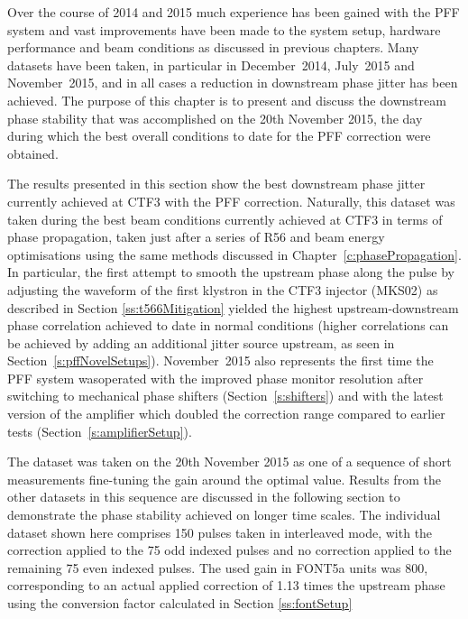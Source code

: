 
Over the course of 2014 and 2015 much experience has been gained with the PFF system
and vast improvements have been made to the system setup, hardware performance and
beam conditions as discussed in previous chapters. Many datasets have been taken, in
particular in December~2014, July~2015 and November~2015, and in all cases a reduction 
in downstream phase jitter has been achieved. The purpose of this chapter is
to present and discuss the downstream phase stability that was accomplished on 
the 20th November 2015, the day during which the best overall conditions to 
date for the PFF correction were obtained.


The results presented in this section show the best downstream phase jitter 
currently achieved at CTF3 with the PFF correction. Naturally, this dataset was 
taken during the best beam conditions currently achieved at CTF3 in terms of
phase propagation, taken just after a series of R56 and beam energy optimisations
using the same methods discussed in Chapter~\ref{c:phasePropagation}. 
In particular, the first attempt to smooth the upstream phase along 
the pulse by adjusting the waveform of the first klystron in the CTF3 injector (MKS02) 
as described in Section \ref{ss:t566Mitigation} yielded the highest upstream-downstream
phase correlation achieved to date in normal conditions (higher correlations can be
achieved by adding an additional jitter source upstream, as seen in 
Section~\ref{s:pffNovelSetups}). 
November~2015 also represents the first time the PFF system wasoperated with 
the improved phase monitor resolution
after switching to mechanical phase shifters (Section~\ref{s:shifters}) and 
with the latest version of the amplifier which doubled the correction range 
compared to earlier tests (Section~\ref{s:amplifierSetup}).
 
The dataset was taken on the 20th November 2015 as one of a sequence of short 
measurements fine-tuning the gain around the optimal value. Results from the other
datasets in this sequence are discussed in the following section to demonstrate the 
phase stability achieved on longer time scales. The individual dataset shown here 
comprises 150 pulses taken in interleaved mode, with the correction applied to the 75 
odd indexed pulses and no correction applied to the remaining 75 even indexed pulses. 
The used gain in FONT5a units was 800, corresponding to an actual applied correction of 
1.13 times the upstream phase using the conversion factor calculated in Section 
\ref{ss:fontSetup}



